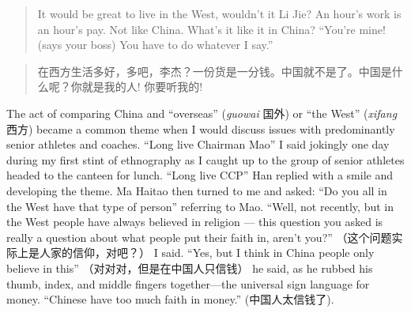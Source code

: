 \begin{CJK}{UTF8}{gbsn}
\begin{quotation}
  It would be great to live in the West, wouldn’t it Li Jie?  An hour’s work is an hour’s pay.  Not like China.  What’s it like it in China? ``You’re mine! (says your boss) You have to do whatever I say.''
\end{quotation}

\begin{quotation}
  在西方生活多好，多吧，李杰？一份货是一分钱。中国就不是了。中国是什么呢？你就是我的人! 你要听我的!
\end{quotation}


The act of comparing China and ``overseas'' (\textit{guowai} 国外) or ``the West'' (\textit{xifang} 西方) became a common theme when I would discuss issues with predominantly senior athletes and coaches.
``Long live Chairman Mao'' I said jokingly one day during my first stint of ethnography as I caught up to the group of senior athletes headed to the canteen for lunch.  ``Long live CCP'' Han replied with a smile and developing the theme.  Ma Haitao then turned to me and asked: ``Do you all in the West have that type of person'' referring to Mao.  ``Well, not recently, but in the West people have always believed in religion --- this question you asked is really a question about what people put their faith in, aren't you?'' （这个问题实际上是人家的信仰，对吧？） I said.  ``Yes, but I think in China people only believe in this'' （对对对，但是在中国人只信钱） he said, as he rubbed his thumb, index, and middle fingers together---the universal sign language for money. ``Chinese have too much faith in money.'' (中国人太信钱了).


\end{CJK}
